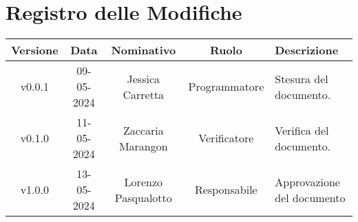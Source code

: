 \section*{\Large Registro delle Modifiche}
    \begin{table}[h]
        \centering
        \renewcommand\tabularxcolumn[1]{m{#1}} %
        \renewcommand{\arraystretch}{1.5}
        \begin{tabularx}{0.98\textwidth}
            {c|c|c|c|>{\centering\arraybackslash}X}
            \rowcolor{black}
            \textbf{\color{white} Versione} & \textbf{\color{white} Data} & \textbf{\color{white} Nominativo} & \textbf{\color{white} Ruolo} & \textbf{\color{white} Descrizione} \\ 
            \hline

            v0.0.1 & 09-05-2024 & Jessica Carretta & Programmatore & Stesura del documento.\\
            v0.1.0 & 11-05-2024 & Zaccaria Marangon & Verificatore & Verifica del documento.\\
            v1.0.0 & 13-05-2024 & Lorenzo Pasqualotto & Responsabile & Approvazione del documento\\
           
            \hline
        \end{tabularx}
    \end{table}